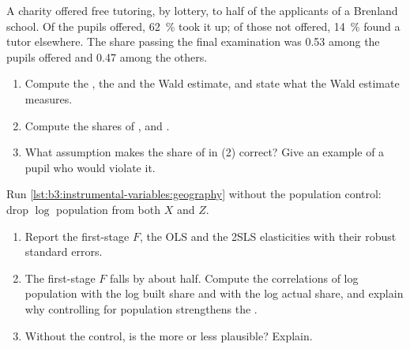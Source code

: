 \begin{exercise}[$\star\star$]\label{exo:b3:instrumental-variables:7}
A charity offered free tutoring, by lottery, to half of the applicants of a
Brenland school. Of the pupils offered, 62~\% took it up; of those not offered,
14~\% found a tutor elsewhere. The share passing the final examination was
0.53 among the pupils offered and 0.47 among the others.
\begin{enumerate}
\item Compute the , the  and the Wald estimate, and
state what the Wald estimate measures.
\item Compute the shares of ,  and .
\item What assumption makes the share of  in (2) correct? Give an
example of a pupil who would violate it.
\end{enumerate}
\end{exercise}

\begin{exercise}[$\star\star$]\label{exo:b3:instrumental-variables:8}
Run \cref{lst:b3:instrumental-variables:geography} without the population
control: drop $\log$ population from both $X$ and $Z$.
\begin{enumerate}
\item Report the first-stage $F$, the OLS and the 2SLS elasticities with their
robust standard errors.
\item The first-stage $F$ falls by about half. Compute the correlations of log
population with the log built share and with the log actual share, and
explain why controlling for population strengthens the .
\item Without the control, is the  more or less
plausible? Explain.
\end{enumerate}
\end{exercise}

